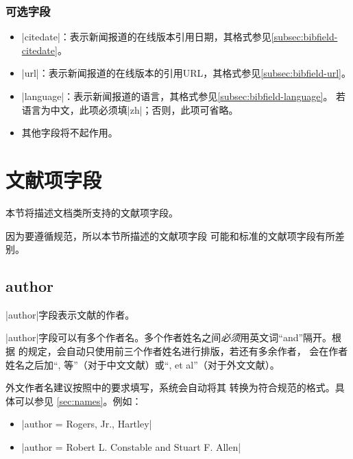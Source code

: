 \subsubsection{可选字段}

\begin{itemize}
\item |citedate|：表示新闻报道的在线版本引用日期，其格式参见\ref{subsec:bibfield-citedate}。
\item |url|：表示新闻报道的在线版本的引用URL，其格式参见\ref{subsec:bibfield-url}。
\item |language|：表示新闻报道的语言，其格式参见\ref{subsec:bibfield-language}。
  若语言为中文，此项必须填|zh|；否则，此项可省略。
\item 其他字段将不起作用。
\end{itemize}


\section{文献项字段}\label{sec:bib-field}

本节将描述{\njuthesis}文档类所支持的文献项字段。

\begin{note}
因为要遵循规范\cite{gbt7714-2005}，所以本节所描述的文献项字段
可能和标准{\BibTeX}的文献项字段有所差别。
\end{note}

\subsection{author}\label{subsec:bibfield-author}

|author|字段表示文献的作者。

|author|字段可以有多个作者名。多个作者姓名之间\emph{必须}用英文词``and''隔开。根据
\cite{gbt7714-2005}的规定，{\BibTeX}会自动只使用前三个作者姓名进行排版，若还有多余作者，
会在作者姓名之后加``, 等''（对于中文文献）或``, et al''（对于外文文献）。

外文作者名建议按照\cite[157]{lamport1994latex}中的要求填写，{\BibTeX}系统会自动将其
转换为符合规范\cite{gbt7714-2005}的格式。具体可以参见
\ref{sec:names}。例如：
\begin{itemize}
\item |author = {Rogers, Jr., Hartley}|
\item |author = {Robert L. Constable and Stuart F. Allen}|
\end{itemize}

